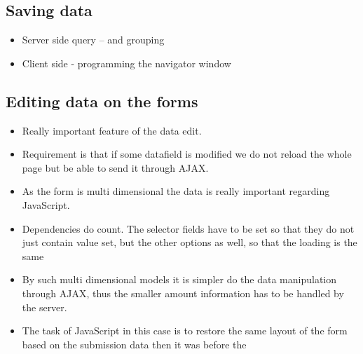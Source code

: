 	
	
	
	
\subsection{Saving data}

\begin{itemize}
	\item Server side query – and grouping
	\item Client side - programming the navigator window
\end{itemize}	



\subsection{Editing data on the forms}


\begin{itemize}
	\item Really important feature of the data edit.
	\item Requirement is that if some datafield is modified we do not reload the whole page but be able to send it through AJAX.
	\item As the form is multi dimensional the data is really important regarding JavaScript.
	\item Dependencies do count. The selector fields have to be set so that they do not just contain value set, but the other options as well, so that the loading is the same
	\item By such multi dimensional models it is simpler do the data manipulation through AJAX, thus the smaller amount information has to be handled by the server.
	\item The task of JavaScript in this case is to restore the same layout of the form based on the submission data then it was before the  
\end{itemize}	













